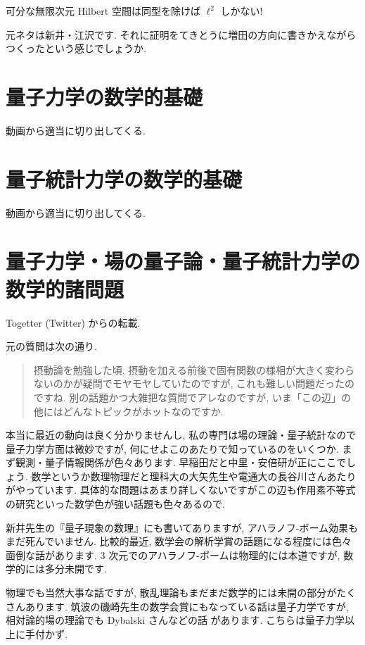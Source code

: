 \documentclass[openany, a4paper, oneside]{jsbook}
\begin{document}
\begin{rem}
 可分な無限次元 Hilbert 空間は同型を除けば $\ell^2$ しかない!
\end{rem}

元ネタは新井・江沢\cite{AraiEzawa1, AraiEzawa2}です.
それに証明をてきとうに増田\cite{HisayaMasuda1}の方向に書きかえながらつくったという感じでしょうか.
\chapter{量子力学の数学的基礎}

動画から適当に切り出してくる.
\chapter{量子統計力学の数学的基礎}

動画から適当に切り出してくる.
\chapter{量子力学・場の量子論・量子統計力学の数学的諸問題}

Togetter (Twitter) からの転載.

元の質問は次の通り.
\begin{quote}
摂動論を勉強した頃, 摂動を加える前後で固有関数の様相が大きく変わらないのかが疑問でモヤモヤしていたのですが,
これも難しい問題だったのですね.
別の話題かつ大雑把な質問でアレなのですが, いま「この辺」の他にはどんなトピックがホットなのですか.
\end{quote}

本当に最近の動向は良く分かりませんし,
私の専門は場の理論・量子統計なので量子力学方面は微妙ですが, 何にせよこのあたりで知っているのをいくつか.
まず観測・量子情報関係が色々あります.
早稲田だと中里・安倍研が正にここでしょう.
数学というか数理物理だと理科大の大矢先生や電通大の長谷川さんあたりがやっています.
具体的な問題はあまり詳しくないですがこの辺も作用素不等式の研究といった数学色が強い話題も色々あるので.

新井先生の『量子現象の数理』\cite{AsaoArai4}にも書いてありますが,
アハラノフ-ボーム効果もまだ死んでいません.
比較的最近, 数学会の解析学賞の話題になる程度には色々面倒な話があります.
3 次元でのアハラノフ-ボームは物理的には本道ですが, 数学的には多分未開です.

物理でも当然大事な話ですが, 散乱理論もまだまだ数学的には未開の部分がたくさんあります.
筑波の磯崎先生の数学会賞にもなっている話は量子力学ですが,
相対論的場の理論でも Dybalski さんなどの話 \cite{WojciechDybalski1} があります.
こちらは量子力学以上に手付かず.
\end{document}
